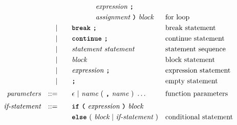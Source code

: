 \begin{alignat*}{9}
&&                       &&     &\quad && \ \ \ \ \ \ \ \ \ \ \textit{expression} \ \textbf{\texttt{;}} \\
&&                       &&     &\quad && \ \ \ \ \ \ \ \ \ \ \textit{assignment} \ \textbf{\texttt{)}} \ 
                                            \textit{block}
                                                           && \textrm{for loop}\\
&&                       && |   &\quad && \textbf{\texttt{break}}\ \textbf{\texttt{;}}
                                                           && \textrm{break statement}\\
&&                       && |   &\quad && \textbf{\texttt{continue}}\ \textbf{\texttt{;}}
                                                           && \textrm{continue statement}\\
&&                       && |   &\quad &&  \textit{statement} \ 
                                    \textit{statement}     && \textrm{statement sequence} \\
&&                       && |   &\quad &&  \textit{block} 
                                                           && \textrm{block statement}\\
&&                       && |   &\quad &&  \textit{expression} \ \textbf{\texttt{;}}
                                                           && \textrm{expression statement} \\
&&                       && |   &\quad &&  \textbf{\texttt{;}}
                                                           && \textrm{empty statement} \\[1mm] 
&& \textit{parameters}   && ::= &\quad &&  \epsilon\ | \  \textit{name} \ 
                                                   (\ \textbf{\texttt{,}} \ \textit{name}\ )\ \ldots
                                                            && \textrm{function parameters}   \\[1mm]
&& \textit{if-statement} && ::= &\quad &&  \textbf{\texttt{if}}\
                                   \textbf{\texttt{(}}\ \textit{expression} \ \textbf{\texttt{)}}\ 
                                   \textit{block} \\
&&                       &&     &      && \textbf{\texttt{else}}\
                                          (\ \textit{block}
                                          \ | \
                                          \textit{if-statement} \ )
                                                            && \textrm{conditional statement}   \\[1mm]

\end{alignat*}
